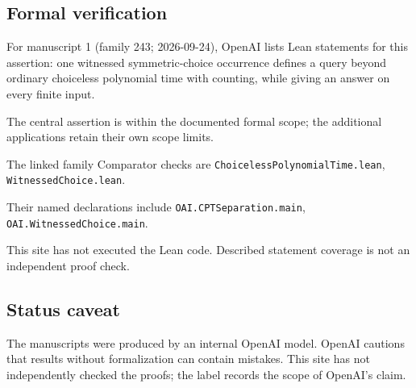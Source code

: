 \documentclass[11pt]{article}
\begin{document}
\subsection{Formal verification}
For manuscript 1 (family 243; 2026-09-24), OpenAI lists Lean statements for this assertion: one witnessed symmetric-choice occurrence defines a query beyond ordinary choiceless polynomial time with counting, while giving an answer on every finite input.

The central assertion is within the documented formal scope; the additional applications retain their own scope limits.

The linked family Comparator checks are \texttt{ChoicelessPolynomialTime.lean}, \texttt{WitnessedChoice.lean}.

Their named declarations include \texttt{OAI.CPTSeparation.main}, \texttt{OAI.WitnessedChoice.main}.

This site has not executed the Lean code. Described statement coverage is not an independent proof check.

\subsection{Status caveat}
The manuscripts were produced by an internal OpenAI model. OpenAI cautions that results without formalization can contain mistakes. This site has not independently checked the proofs; the label records the scope of OpenAI's claim.
\end{document}
